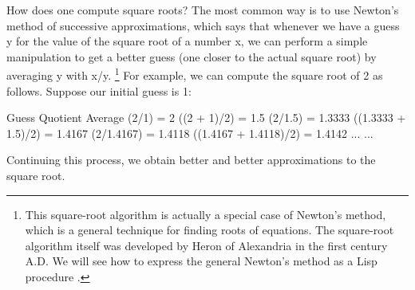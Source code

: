 How does one compute square roots?
The most common way is to use Newton's method of successive approximations,
which says that whenever we have a guess y for the value of the square root of a number x,
we can perform a simple manipulation to get a better guess
(one closer to the actual square root)
by averaging y with x/y.
\footnote{%
   This square-root algorithm is actually a special case of Newton's method,
   which is a general technique for finding roots of equations.
   The square-root algorithm itself was developed by Heron of Alexandria in the first century A.D.
   We will see how to express the general Newton's method as a Lisp procedure .
}
 For example, we can compute the square root of 2 as follows. Suppose our initial guess is 1:

\starttabulate[|lT|lT|lT|]
\NC Guess   \NC Quotient             \NC Average                       \NR
{}       \NC (2/1) = 2           \NC ((2 + 1)/2) = 1.5              \NR
{}     \NC (2/1.5) = 1.3333    \NC ((1.3333 + 1.5)/2) = 1.4167    \NR
{}  \NC (2/1.4167) = 1.4118 \NC ((1.4167 + 1.4118)/2) = 1.4142 \NR
{}  \NC ...                 \NC ...                            \NR
\stoptabulate

Continuing this process, we obtain better and better approximations to the square root.

